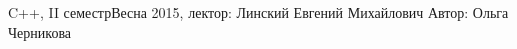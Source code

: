 


\BigHeader
	{C++, II семестр}{Весна 2015, лектор: Линский Евгений Михайлович}
	{Автор: Ольга Черникова}

 


